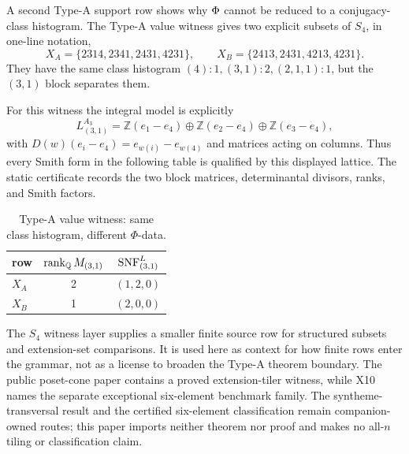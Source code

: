 A second Type-A support row shows why \(\Phi\) cannot be reduced to a conjugacy-class histogram.  The Type-A value witness gives two explicit subsets of \(S_4\), in one-line notation,
\[
  X_A=\{2314,2341,2431,4231\},\qquad
  X_B=\{2413,2431,4213,4231\}.
\]
They have the same class histogram \((4):1,(3,1):2,(2,1,1):1\), but the \((3,1)\) block separates them.

For this witness the integral model is explicitly
\[
  L_{(3,1)}^{A_3}
  =\mathbb Z(e_1-e_4)\oplus\mathbb Z(e_2-e_4)
   \oplus\mathbb Z(e_3-e_4),
\]
with \(D(w)(e_i-e_4)=e_{w(i)}-e_{w(4)}\) and matrices acting on columns.
Thus every Smith form in the following table is qualified by this displayed
lattice.  The static certificate records the two block matrices,
determinantal divisors, ranks, and Smith factors.

\begin{table}[ht]
\centering
\caption{Type-A value witness: same class histogram, different \(\Phi\)-data.}
\label{tab:type-a-value-witness}
\begin{tabular}{@{}lcc@{}}
\toprule
row & \(\operatorname{rank}_\mathbb{Q}M_{(3,1)}\) & \(\operatorname{SNF}^{L}_{(3,1)}\) \\
\midrule
\(X_A\) & 2 & \((1,2,0)\) \\
\(X_B\) & 1 & \((2,0,0)\) \\
\bottomrule
\end{tabular}
\end{table}

The \(S_4\) witness layer\cite{BabanskyyS4Layer2026} supplies a smaller finite source row for structured subsets and extension-set comparisons.  It is used here as context for how finite rows enter the grammar, not as a license to broaden the Type-A theorem boundary.  The public poset-cone paper contains a proved extension-tiler witness, while X10 names the separate exceptional six-element benchmark family.  The syntheme-transversal result and the certified six-element classification remain companion-owned routes\cite{BabanskyyS6Syntheme2026,BabanskyyS6TileClassification2026}; this paper imports neither theorem nor proof and makes no all-\(n\) tiling or classification claim.
